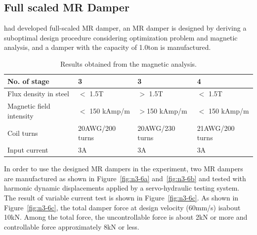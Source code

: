 \subsection{Full scaled MR Damper}
\citet{lee2010experimental} had developed full-scaled MR damper, an MR damper is designed by deriving a suboptimal design procedure considering optimization problem and magnetic analysis, and a damper with the
capacity of 1.0ton is manufactured.

\begin{table}[ht]
\centering
\begin{tabularx}{\textwidth}{@{}X|X|X|X@{}}
\toprule[1pt]\midrule[0.3pt]
No. of stage & 3 & 3 & 4\\ \hline
Flux density in steel & $<$ 1.5T & $>$ 1.5T & $<$ 1.5T\\
Magnetic field intensity & $<$ 150 kAmp/m  & $>$150 kAmp/m  & $<$ 150 kAmp/m \\
Coil turns & 20AWG/200 turns  & 20AWG/230 turns & 21AWG/200 turns  \\
Input current & 3A  & 3A & 3A  \\
\bottomrule
\end{tabularx}
\caption{Results obtained from the magnetic analysis.}
\label{tab:n3-1}
\end{table}

In order to use the designed MR dampers in the experiment, two MR dampers are manufactured as shown in Figure~\ref{fig:n3-6a} and~\ref{fig:n3-6b} and tested with harmonic dynamic displacements applied by a servo-hydraulic testing system. The result of variable current test is shown in Figure~\ref{fig:n3-6c}. As shown in Figure~\ref{fig:n3-6c}, the total damper force at design velocity (60mm/s) isabout 10kN. Among the total force, the uncontrollable force is about 2kN or more and controllable force approximately 8kN or less.

